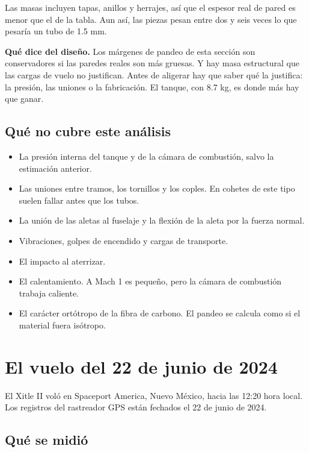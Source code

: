 Las masas incluyen tapas, anillos y herrajes, así que el
espesor real de pared es menor que el de la tabla. Aun así,
las piezas pesan entre dos y seis veces lo que pesaría un
tubo de 1.5 mm.

\textbf{Qué dice del diseño.} Los márgenes de pandeo de esta
sección son conservadores si las paredes reales son más
gruesas. Y hay masa estructural que las cargas de vuelo no
justifican. Antes de aligerar hay que saber qué la
justifica: la presión, las uniones o la fabricación. El
tanque, con 8.7 kg, es donde más hay que ganar.

\subsection{Qué no cubre este
análisis}\label{quuxe9-no-cubre-este-anuxe1lisis}

\begin{itemize}
\tightlist
\item
  La presión interna del tanque y de la cámara de
  combustión, salvo la estimación anterior.
\item
  Las uniones entre tramos, los tornillos y los coples. En
  cohetes de este tipo suelen fallar antes que los tubos.
\item
  La unión de las aletas al fuselaje y la flexión de la
  aleta por la fuerza normal.
\item
  Vibraciones, golpes de encendido y cargas de transporte.
\item
  El impacto al aterrizar.
\item
  El calentamiento. A Mach 1 es pequeño, pero la cámara de
  combustión trabaja caliente.
\item
  El carácter ortótropo de la fibra de carbono. El pandeo se
  calcula como si el material fuera isótropo.
\end{itemize}

\section{El vuelo del 22 de junio de
2024}\label{el-vuelo-del-22-de-junio-de-2024}

El Xitle II voló en Spaceport America, Nuevo México, hacia
las 12:20 hora local. Los registros del rastreador GPS están
fechados el 22 de junio de 2024.

\subsection{Qué se midió}\label{quuxe9-se-midiuxf3}

